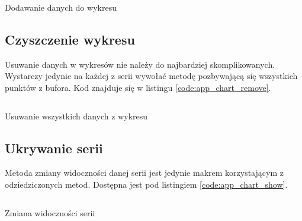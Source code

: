         \begin{kod}
          \inputminted[firstline=71, lastline=94]{cpp}{app/listings/chart.cpp}
          \caption{Dodawanie danych do wykresu}
          \label{code:app_chart_add}
        \end{kod}   
        
    \subsection{Czyszczenie wykresu}
        Usuwanie danych w wykresów nie należy do najbardziej skomplikowanych. Wystarczy jedynie na każdej z serii wywołać metodę pozbywającą się wszystkich punktów z bufora. Kod znajduje się w listingu \ref{code:app_chart_remove}.
      
        \begin{kod}
          \inputminted[firstline=97, lastline=105]{cpp}{app/listings/chart.cpp}
          \caption{Usuwanie wszystkich danych z wykresu}
          \label{code:app_chart_remove}
        \end{kod}   
        
    \subsection{Ukrywanie serii}
        Metoda zmiany widoczności danej serii jest jedynie makrem korzystającym z odziedziczonych metod. Dostępna jest pod listingiem \ref{code:app_chart_show}.

        \begin{kod}
          \inputminted[firstline=108]{cpp}{app/listings/chart.cpp}
          \caption{Zmiana widoczności serii}
          \label{code:app_chart_show}
        \end{kod}   